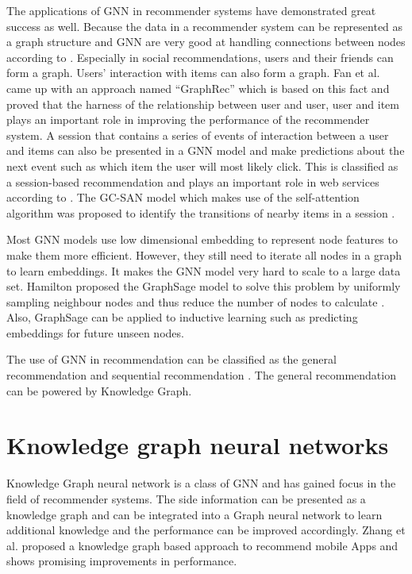 \documentclass[11pt,twoside]{report}
\begin{document}
The applications of GNN in recommender systems have demonstrated great success as well. Because the data in a recommender system can be represented as a graph structure and GNN are very good at handling connections between nodes according to \cite{wu_graph_2020}. Especially in social recommendations, users and their friends can form a graph. Users’ interaction with items can also form a graph. Fan et al. came up with an approach named “GraphRec” which is based on this fact \cite{fan_graph_2019} and proved that the harness of the relationship between user and user, user and item plays an important role in improving the performance of the recommender system. A session that contains a series of events of interaction between a user and items can also be presented in a GNN model and make predictions about the next event such as which item the user will most likely click. This is classified as a session-based recommendation and plays an important role in web services according to \cite{xu_graph_2019}. The GC-SAN model which makes use of the self-attention algorithm was proposed to identify the transitions of nearby items in a session \cite{xu_graph_2019}.

Most GNN models use low dimensional embedding to represent node features to make them more efficient. However, they still need to iterate all nodes in a graph to learn embeddings. It makes the GNN model very hard to scale to a large data set. Hamilton \cite{hamilton_inductive_2018} proposed the GraphSage model to solve this problem by uniformly sampling neighbour nodes and thus reduce the number of nodes to calculate \cite{hamilton_inductive_2018}. Also, GraphSage can be applied to inductive learning such as predicting embeddings for future unseen nodes.

The use of GNN in recommendation can be classified as the general recommendation and sequential recommendation \cite{wu_graph_2020}. The general recommendation can be powered by Knowledge Graph.

\section{Knowledge graph neural networks}
Knowledge Graph neural network is a class of GNN and has gained focus in the field of recommender systems. The side information can be presented as a knowledge graph and can be integrated into a Graph neural network to learn additional knowledge and the performance can be improved accordingly. Zhang et al. \cite{zhang_knowledge_2020} proposed a knowledge graph based approach to recommend mobile Apps and shows promising improvements in performance.
\end{document}
